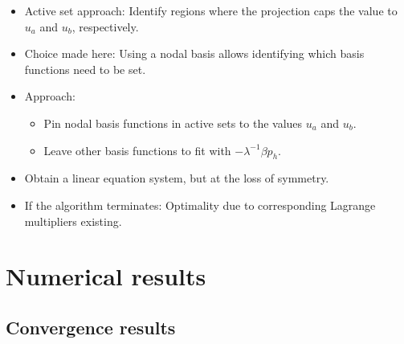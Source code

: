 \documentclass[10pt, USenglish]{beamer}
\begin{document}
\begin{frame}
\begin{itemize}
\item Active set approach: Identify regions where the projection caps the value to $u_a$ and $u_b$, respectively. 
\item Choice made here: Using a nodal basis allows identifying which basis functions need to be set.
\item Approach:
\begin{itemize}
\item Pin nodal basis functions in active sets to the values $u_a$ and $u_b$.
\item Leave other basis functions to fit with $-\lambda^{-1} \beta p_h$.
\end{itemize}
\item Obtain a linear equation system, but at the loss of symmetry.
\item If the algorithm terminates: Optimality due to corresponding Lagrange multipliers existing.
\end{itemize}
\end{frame}

\section{Numerical results}
\subsection{Convergence results}
\end{document}
